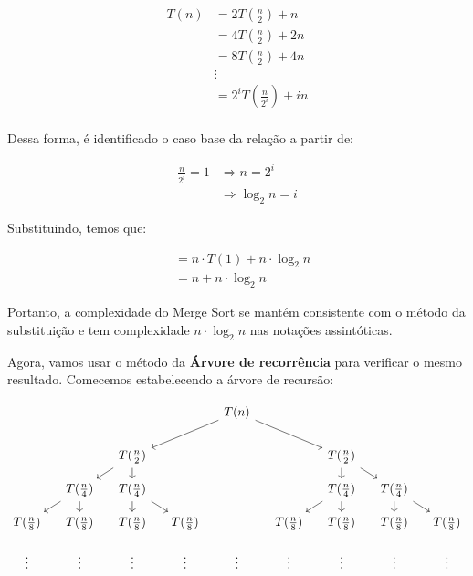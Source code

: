 \begin{align*}
	T(n) & =  2T\left(\frac{n}{2}\right) + n     \\
	     & = 4T\left(\frac{n}{2}\right) + 2n     \\
	     & = 8T\left(\frac{n}{2}\right) + 4n     \\
	     & \vdots                                \\
	     & = 2^iT\left(\frac{n}{2^i}\right) + in \\
\end{align*}

Dessa forma, é identificado o caso base da relação a partir de:

\begin{align*}
	\frac{n}{2^i} = 1 & \Longrightarrow n = 2^i      \\
	                  & \Longrightarrow \log_2 n = i
\end{align*}

Substituindo, temos que:

\begin{align*}
	 & = n \cdot T(1) + n \cdot \log_2 n \\
	 & = n + n \cdot \log_2 n
\end{align*}

Portanto, a complexidade do Merge Sort se mantém consistente com o método da substituição e tem complexidade $n \cdot \log_2 n$ nas notações assintóticas.

Agora, vamos usar o método da \textbf{Árvore de recorrência} para verificar o mesmo resultado. Comecemos estabelecendo a árvore de recursão:


\[\begin{tikzcd}[sep=small]
		&&&& {T(n)} \\
		\\
		&& {T(\frac{n}{2})} &&&& {T(\frac{n}{2})} \\
		& {T(\frac{n}{4})} & {T(\frac{n}{4})} &&&& {T(\frac{n}{4})} & {T(\frac{n}{4})} \\
		{T(\frac{n}{8})} & {T(\frac{n}{8})} & {T(\frac{n}{8})} & {T(\frac{n}{8})} && {T(\frac{n}{8})} & {T(\frac{n}{8})} & {T(\frac{n}{8})} & {T(\frac{n}{8})} \\
		\vdots & \vdots & \vdots & \vdots & \vdots & \vdots & \vdots & \vdots & \vdots
		\arrow[from=1-5, to=3-3]
		\arrow[from=1-5, to=3-7]
		\arrow[from=3-3, to=4-2]
		\arrow[from=3-3, to=4-3]
		\arrow[from=3-7, to=4-7]
		\arrow[from=3-7, to=4-8]
		\arrow[from=4-2, to=5-1]
		\arrow[from=4-2, to=5-2]
		\arrow[from=4-3, to=5-3]
		\arrow[from=4-3, to=5-4]
		\arrow[from=4-7, to=5-6]
		\arrow[from=4-7, to=5-7]
		\arrow[from=4-8, to=5-8]
		\arrow[from=4-8, to=5-9]
	\end{tikzcd}\]
\FloatBarrier

